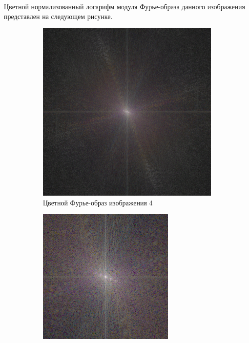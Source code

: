 \documentclass[a4paper, 12pt]{article}
\begin{document}
    Цветной нормализованный логарифм модуля Фурье-образа данного изображения представлен на следующем
    рисунке.
    \begin{figure}[H]
        \centering
        \begin{subfigure}{0.45\textwidth}
            \centering
            \includegraphics[width=\linewidth]{fft2.png}
            \caption{Цветной Фурье-образ изображения 4}
            \label{fig:4fft2}
        \end{subfigure}
        \begin{subfigure}{0.45\textwidth}
            \centering
            \includegraphics[width=\linewidth]{fft2_close.png}

\end{subfigure}
\end{figure}
\end{document}
